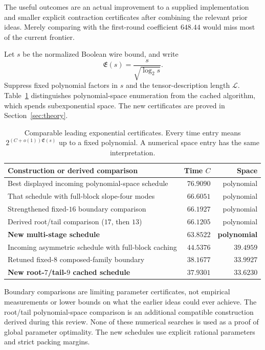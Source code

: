 \documentclass[11pt,letterpaper]{article}
\theoremstyle{remark}\newtheorem{remark}[theorem]{Remark}
\begin{document}
The useful outcomes are an actual improvement to a supplied implementation
and smaller explicit contraction certificates after combining the relevant
prior ideas. Merely comparing with the first-round coefficient $648.44$
would miss most of the current frontier.

Let $s$ be the normalized Boolean wire bound, and write
\[
 \mathfrak E(s)=\frac{s}{\sqrt{\log_2s}}.
\]
Suppress fixed polynomial factors in $s$ and the tensor-description length
$\mathcal L$. Table~\ref{tab:frontier} distinguishes polynomial-space
enumeration from the cached algorithm, which spends subexponential space.
The new certificates are proved in Section~\ref{sec:theory}.

\begin{table}[htbp]\centering\small
\caption{Comparable leading exponential certificates. Every time entry
means $2^{(C+o(1))\mathfrak E(s)}$ up to a fixed polynomial. A numerical
space entry has the same interpretation.}
\label{tab:frontier}
\begin{tabular}{@{}p{}rr@{}}\toprule
Construction or derived comparison & Time $C$ & Space\\\midrule
Best displayed incoming polynomial-space schedule & $76.9090$ & polynomial\\
That schedule with full-block slope-four modes & $66.6051$ & polynomial\\
Strengthened fixed-$16$ boundary comparison & $66.1927$ & polynomial\\
Derived root/tail comparison ($17$, then $13$) & $66.1205$ & polynomial\\
\textbf{New multi-stage schedule} & $\mathbf{63.8522}$ & \textbf{polynomial}\\\midrule
Incoming asymmetric schedule with full-block caching & $44.5376$ & $39.4959$\\
Retuned fixed-$8$ composed-family boundary & $38.1677$ & $33.9927$\\
\textbf{New root-$7$/tail-$9$ cached schedule} & $\mathbf{37.9301}$ & $\mathbf{33.6230}$\\\bottomrule
\end{tabular}
\end{table}

Boundary comparisons are limiting parameter certificates, not empirical
measurements or lower bounds on what the earlier ideas could ever achieve.
The root/tail polynomial-space comparison is an additional compatible
construction derived during this review. None of these numerical searches
is used as a proof of global parameter optimality. The new schedules use
explicit rational parameters and strict packing margins.
\end{document}
